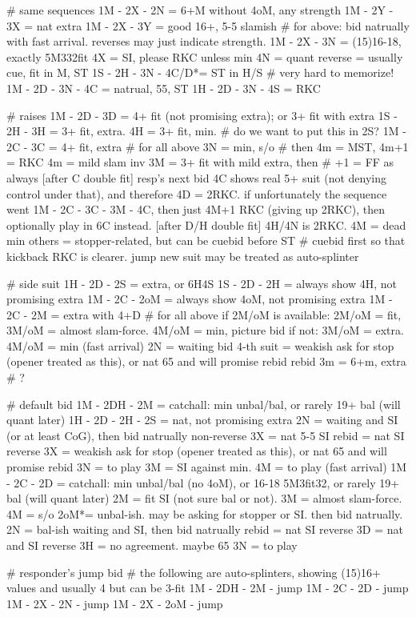 # same sequences
1M - 2X - 2N = 6+M without 4oM, any strength
1M - 2Y - 3X = nat extra
1M - 2X - 3Y = good 16+, 5-5 slamish
    # for above: bid natrually with fast arrival. reverses may just indicate strength.
1M - 2X - 3N = (15)16-18, exactly 5M332fit
    4X = SI, please RKC unless min
    4N = quant
    reverse = usually cue, fit in M, ST
    1S - 2H - 3N - 4C/D*= ST in H/S  # very hard to memorize!
    1M - 2D - 3N - 4C = natrual, 55, ST
    1H - 2D - 3N - 4S = RKC

# raises
1M - 2D - 3D = 4+ fit (not promising extra); or 3+ fit with extra
1S - 2H - 3H = 3+ fit, extra. 4H = 3+ fit, min.  # do we want to put this in 2S?
1M - 2C - 3C = 4+ fit, extra
    # for all above
    3N = min, s/o  # then 4m = MST, 4m+1 = RKC
    4m = mild slam inv
    3M = 3+ fit with mild extra, then  # +1 = FF as always
        [after C double fit] resp's next bid 4C shows real 5+ suit (not denying control under that), and therefore 4D = 2RKC. if unfortunately the sequence went 1M - 2C - 3C - 3M - 4C, then just 4M+1 RKC (giving up 2RKC), then optionally play in 6C instead.
        [after D/H double fit] 4H/4N is 2RKC.
    4M = dead min
    others = stopper-related, but can be cuebid before ST
    # cuebid first so that kickback RKC is clearer. jump new suit may be treated as auto-splinter

# side suit
1H - 2D - 2S = extra, or 6H4S
1S - 2D - 2H = always show 4H, not promising extra
1M - 2C - 2oM = always show 4oM, not promising extra
1M - 2C - 2M = extra with 4+D
    # for all above
    if 2M/oM is available: 2M/oM = fit, 3M/oM = almost slam-force. 4M/oM = min, picture bid
    if not: 3M/oM = extra. 4M/oM = min (fast arrival)
    2N = waiting bid
    4-th suit = weakish ask for stop (opener treated as this), or nat 65 and will promise rebid
    rebid 3m = 6+m, extra  # ?

# default bid
1M - 2DH - 2M = catchall: min unbal/bal, or rarely 19+ bal (will quant later)
    1H - 2D - 2H - 2S = nat, not promising extra
    2N = waiting and SI (or at least CoG), then bid natrually
    non-reverse 3X = nat 5-5 SI
    rebid = nat SI
    reverse 3X = weakish ask for stop (opener treated as this), or nat 65 and will promise rebid
    3N = to play
    3M = SI against min. 4M = to play (fast arrival)
1M - 2C - 2D = catchall: min unbal/bal (no 4oM), or 16-18 5M3fit32, or rarely 19+ bal (will quant later)
    2M = fit SI (not sure bal or not). 3M = almost slam-force. 4M = s/o
    2oM*= unbal-ish. may be asking for stopper or SI. then bid natrually.
    2N = bal-ish waiting and SI, then bid natrually
    rebid = nat SI
    reverse 3D = nat and SI
    reverse 3H = no agreement. maybe 65
    3N = to play

# responder's jump bid
# the following are auto-splinters, showing (15)16+ values and usually 4 but can be 3-fit
1M - 2DH - 2M - jump 
1M - 2C - 2D - jump
1M - 2X - 2N - jump
1M - 2X - 2oM - jump